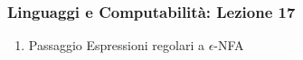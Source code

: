 




\begin{frame}[fragile]
	\frametitle{Linguaggi e Computabilità: Lezione 17}
\begin{enumerate}
\item
Passaggio Espressioni regolari a $\epsilon$-NFA
\end{enumerate}
\end{frame}



